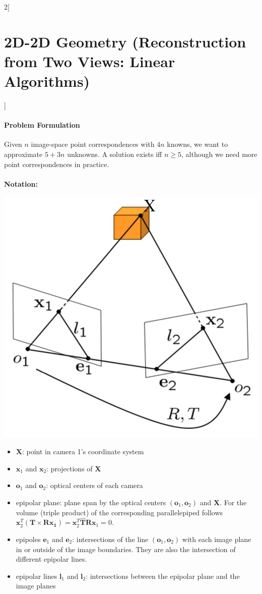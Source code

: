 \documentclass[oneside,fontsize=11pt,paper=a4]{scrartcl}
\newenvironment{myfigure}
  {\par\medskip\noindent\minipage{\linewidth}}
  {\endminipage\par\medskip}
\begin{document}
\begin{multicols}{2}[\section{2D-2D Geometry (Reconstruction from Two Views: Linear Algorithms)}]
\paragraph{Problem Formulation} Given $n$ image-space point correspondences with $4n$ knowns, we want to approximate $5+3n$ unknowns. A solution exists iff $n\geq5$, although we need more point correspondences in practice. 
\\\\
\textbf{Notation:}
\begin{myfigure}
 \centering
 \includegraphics[width=0.65\linewidth]{Images/Epipolar_geometry.jpg}
\end{myfigure}
\begin{itemize}
    \item $\mathbf{X}$: point in camera 1's coordinate system
    \item $\mathbf{x}_1$ and $\mathbf{x}_2$: projections of  $\mathbf{X}$
    \item $\mathbf{o}_1$ and $\mathbf{o}_2$: optical centers of each camera
    \item epipolar plane: plane span by the optical centers $(\mathbf{o}_1,\mathbf{o}_2)$ and $\mathbf{X}$. For the volume (triple product) of the corresponding parallelepiped follows $\mathbf{x}_2^T(\mathbf{T} \times \mathbf{R} \mathbf{x_1}) = \mathbf{x}_2^T \mathbf{\hat{T}} \mathbf{R} \mathbf{x}_1 = 0$.
    \item epipoles $\mathbf{e}_1$ and $\mathbf{e}_2$:  intersections of the line $(\mathbf{o}_1, \mathbf{o}_2)$ with each image plane in or outside of the image boundaries. They are also the intersection of different epipolar lines.
    \item epipolar lines $\mathbf{l}_1$ and $\mathbf{l}_2$:  intersections between the epipolar plane and the image planes
\end{itemize}


\end{multicols}
\end{document}
